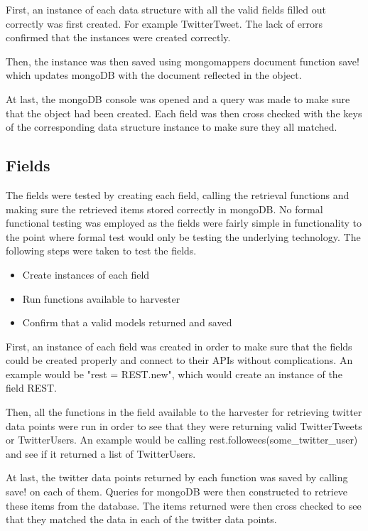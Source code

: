 First, an instance of each data structure with all the valid fields filled out correctly was first created. For example TwitterTweet. The lack of errors confirmed that the instances were created correctly.

Then, the instance was then saved using mongomappers document function save! which updates mongoDB with the document reflected in the object.

At last, the mongoDB console was opened and a query was made to make sure that the object had been created. Each field was then cross checked with the keys of the corresponding data structure instance to make sure they all matched.

\subsection{Fields}
The fields were tested by creating each field, calling the retrieval functions and making sure the retrieved items stored correctly in mongoDB. No formal functional testing was employed as the fields were fairly simple in functionality to the point where formal test would only be testing the underlying technology. The following steps were taken to test the fields.

	\begin{itemize}
	\item Create instances of each field
	\item Run functions available to harvester
	\item Confirm that a valid models returned and saved
	\end{itemize}

First, an instance of each field was created in order to make sure that the fields could be created properly and connect to their APIs without complications. An example would be "rest = REST.new", which would create an instance of the field REST.

Then, all the functions in the field available to the harvester for retrieving twitter data points were run in order to see that they were returning valid TwitterTweets or TwitterUsers. An example would be calling rest.followees(some\_twitter\_user) and see if it returned a list of TwitterUsers.

At last, the twitter data points returned by each function was saved by calling save! on each of them. Queries for mongoDB were then constructed to retrieve these items from the database. The items returned were then cross checked to see that they matched the data in each of the twitter data points.

